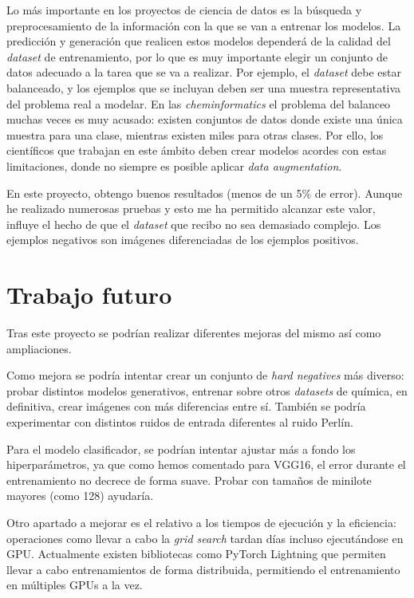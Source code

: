Lo más importante en los proyectos de ciencia de datos es la búsqueda y preprocesamiento de la información con la que se van a entrenar los modelos. La predicción y generación que realicen estos modelos dependerá de la calidad del \textit{dataset} de entrenamiento, por lo que es muy importante elegir un conjunto de datos adecuado a la tarea que se va a realizar. Por ejemplo, el \textit{dataset} debe estar balanceado, y los ejemplos que se incluyan deben ser una muestra representativa del problema real a modelar. En las \textit{cheminformatics} el problema del balanceo muchas veces es muy acusado: existen conjuntos de datos donde existe una única muestra para una clase, mientras existen miles para otras clases. Por ello, los científicos que trabajan en este ámbito deben crear modelos acordes con estas limitaciones, donde no siempre es posible aplicar \textit{data augmentation}. 

En este proyecto, obtengo buenos resultados (menos de un 5\% de error). Aunque he realizado numerosas pruebas y esto me ha permitido alcanzar este valor, influye el hecho de que el \textit{dataset} que recibo no sea demasiado complejo. Los ejemplos negativos son imágenes diferenciadas de los ejemplos positivos.

\section{Trabajo futuro}
Tras este proyecto se podrían realizar diferentes mejoras del mismo así como ampliaciones. 

Como mejora se podría intentar crear un conjunto de \textit{hard negatives} más diverso: probar distintos modelos generativos, entrenar sobre otros \textit{datasets} de química, en definitiva, crear imágenes con más diferencias entre sí. También se podría experimentar con distintos ruidos de entrada diferentes al ruido Perlín. 

Para el modelo clasificador, se podrían intentar ajustar más a fondo los hiperparámetros, ya que como hemos comentado para VGG16, el error durante el entrenamiento no decrece de forma suave. Probar con tamaños de minilote mayores (como 128) ayudaría.

Otro apartado a mejorar es el relativo a los tiempos de ejecución y la eficiencia: operaciones como llevar a cabo la \textit{grid search} tardan días incluso ejecutándose en GPU. Actualmente existen bibliotecas como PyTorch Lightning que permiten llevar a cabo entrenamientos de forma distribuida, permitiendo el entrenamiento en múltiples GPUs a la vez.

